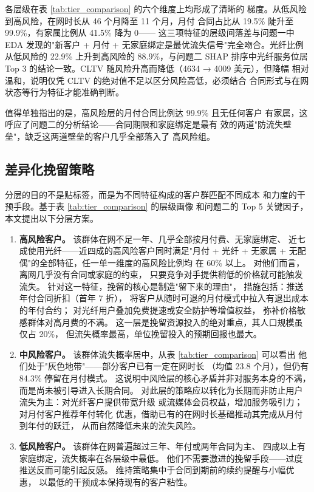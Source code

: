 各层级在表 \ref{tab:tier_comparison} 的六个维度上均形成了清晰的
梯度。从低风险到高风险，在网时长从 46 个月降至 11 个月，月付
合同占比从 19.5\% 陡升至 99.9\%，有家属比例从 41.5\% 降为 0——
这三项特征的层级间落差与问题一中 EDA 发现的"新客户 + 月付 +
无家庭绑定是最优流失信号"完全吻合。光纤比例从低风险的 22.9\%
上升到高风险的 88.9\%，与问题二 SHAP 排序中光纤服务位居 Top 3
的结论一致。CLTV 随风险升高而降低（4634 → 4009 美元），但降幅
相对温和，说明仅凭 CLTV 的绝对值不足以区分风险高低，必须结合
合同形式与在网状态等行为特征才能准确判断。

值得单独指出的是，高风险层的月付合同比例达 99.9\% 且无任何客户
有家属，这呼应了问题二的分析结论——合同期限和家庭绑定是最有
效的两道"防流失壁垒"，缺乏这两道壁垒的客户几乎全部落入了
高风险组。

\subsection{差异化挽留策略}

分层的目的不是贴标签，而是为不同特征构成的客户群匹配不同成本
和力度的干预手段。基于表 \ref{tab:tier_comparison} 的层级画像
和问题二的 Top 5 关键因子，本文提出以下分层方案。

\begin{enumerate}
    \item \textbf{高风险客户。}
    该群体在网不足一年、几乎全部按月付费、无家庭绑定、
    近七成使用光纤——近四成的高风险客户同时满足"月付 + 光纤
    + 无家属 + 无配偶"的全部特征，任一单一维度的高风险比例均
    在 60\% 以上。
    对他们而言，离网几乎没有合同或家庭的约束，
    只要竞争对手提供稍低的价格就可能触发流失。
    针对这一特征，挽留的核心是制造"留下来的理由"，
    措施包括：推送年付合同折扣（首年 7 折），
    将客户从随时可退的月付模式中拉入有退出成本的年付合约；
    对光纤用户叠加免费提速或安全防护等增值权益，
    弥补价格敏感群体对高月费的不满。
    这一层是挽留资源投入的绝对重点，其人口规模虽仅占 20\%，
    但流失概率最高，单位挽留投入的预期回报也最大。

    \item \textbf{中风险客户。}
    该群体流失概率居中，从表 \ref{tab:tier_comparison} 可以看出
    他们处于"灰色地带"——部分客户已有一定在网时长
    （均值 23.8 个月），但仍有 84.3\% 停留在月付模式。
    这说明中风险层的核心矛盾并非对服务本身的不满，
    而是尚未被引导进入长期合同。
    对此层的策略应以转化为长期而非防止用户流失为主：对光纤客户提供带宽升级
    或流媒体会员权益，增加服务吸引力；对月付客户推荐年付转化
    优惠，借助已有的在网时长基础推动其完成从月付到年付的跃迁，
    从而自然降低未来的流失风险。

    \item \textbf{低风险客户。}
    该群体在网普遍超过三年、年付或两年合同为主、
    四成以上有家庭绑定，流失概率在各层级中最低。
    他们不需要激进的挽留手段——过度推送反而可能引起反感。
    维持策略集中于合同到期前的续约提醒与小幅优惠，
    以最低的干预成本保持现有的客户粘性。
\end{enumerate}

